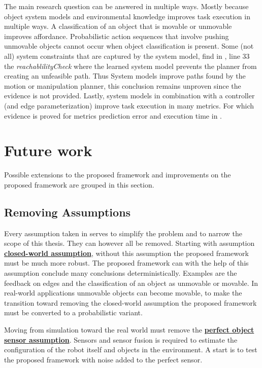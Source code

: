 The main research question can be answered in multiple ways. Mostly because object system models and environmental knowledge improves task execution in multiple ways. A classification of an object that is movable or unmovable improves affordance. Probabilistic action sequences that involve pushing unmovable objects cannot occur when object classification is present. Some (not all) system constraints that are captured by the system model, find in , line 33 the \textit{reachablilityCheck} where the learned system model prevents the planner from creating an unfeasible path. Thus System models improve paths found by the motion or manipulation planner, this conclusion remains unproven since the evidence is not provided. Lastly, system models in combination with a controller (and edge parameterization) improve task execution in many metrics. For which evidence is proved for metrics prediction error and execution time in .\bs
{}

\section{Future work}%
\label{sec:future_work}
Possible extensions to the proposed framework and improvements on the proposed framework are grouped in this section.\bs

\subsection{Removing Assumptions}
Every assumption taken in  serves to simplify the problem and to narrow the scope of this thesis. They can however all be removed. Starting with assumption \hyperref[assumption:closed_world]{\textbf{closed-world assumption}}, without this assumption the proposed framework must be much more robust. The proposed framework can with the help of this assumption conclude many conclusions deterministically. Examples are the feedback on edges and the classification of an object as unmovable or movable. In real-world applications unmovable objects can become movable, to make the transition toward removing the closed-world assumption the proposed framework must be converted to a probabilistic variant.\bs

Moving from simulation toward the real world must remove the \hyperref[assumption:perfect_object_sensor]{\textbf{perfect object sensor assumption}}. Sensors and sensor fusion is required to estimate the configuration of the robot itself and objects in the environment. A start is to test the proposed framework with noise added to the perfect sensor.\bs

